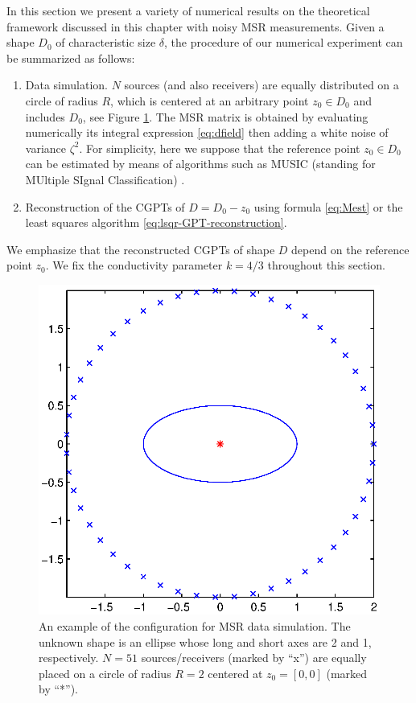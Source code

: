 \label{sec:results-GPT-extraction}

In this section we present a variety of numerical results on the
theoretical framework discussed in this chapter with noisy MSR  measurements. Given a shape
$D_0$ of characteristic size $\delta$, the procedure of our
numerical experiment can be summarized as follows:
\begin{enumerate}
\item Data simulation. $N$ sources (and also receivers) are
equally
  distributed on a circle of radius $R$, which is centered at an
  arbitrary point $z_0\in D_0$ and includes $D_0$, see Figure
  \ref{fig:data_acq}. The MSR matrix is obtained by evaluating
  numerically its integral expression \eqref{eq:dfield} then adding a
  white noise of variance $\zeta^2$. For simplicity, here
  we suppose that the reference point $z_0\in D_0$ can be estimated by
  means of  algorithms such as MUSIC (standing for MUltiple SIgnal Classification) \cite{AGJ, ammari2007polarization}.
\item Reconstruction of the CGPTs of $D=D_0-z_0$ using formula
  \eqref{eq:Mest} or the least squares algorithm \eqref{eq:lsqr-GPT-reconstruction}.
\end{enumerate}
We emphasize that the reconstructed CGPTs of shape $D$ depend on
the reference point $z_0$. We fix the conductivity parameter
$k=4/3$ throughout this section.

\begin{figure}[htp]
  \centering
  \includegraphics[width=.4\textwidth]{dico/figures/fig1_ellipse_std}
  \caption{An example of the configuration for MSR data
    simulation. The unknown shape is an ellipse whose long and short
    axes are 2 and 1, respectively. $N=51$ sources/receivers (marked by
    ``x'') are equally placed on a circle of radius $R=2$ centered at
    $z_0=[0,0]$ (marked by ``*'').}
  \label{fig:data_acq}
\end{figure}

